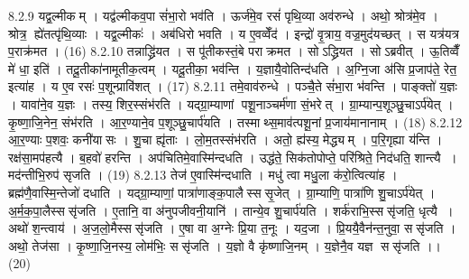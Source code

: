 8.2.9
यद्व॒ल्मीकम् । यद्व॑ल्मीकव॒पा सं॑भा॒रो भव॑ति । ऊर्ज॑मे॒व रसं॑ पृथि॒व्या अव॑रुन्धे । अथो॒ श्रोत्र॑मे॒व । श्रोत्र॒ ह्ये॑तत्पृ॑थि॒व्याः । यद्व॒ल्मीकः॑ । अब॑धिरो भवति । य ए॒वव्वेँद॑ । इन्द्रो॑ वृ॒त्राय॒ वज्र॒मुद॑यच्छत् । स यत्र॑यत्र प॒राक्र॑मत । (16)
8.2.10
तन्नाद्ध्रि॑यत । स पू॑तीकस्तं॒बे पराक्रमत । सोऽद्ध्रियत । सोऽब्रवीत् । ऊ॒तिव्वैँ मे॑ धा॒ इति॑ । तदू॒तीका॑नामूतीक॒त्वम् । यदू॒तीका॒ भव॑न्ति । य॒ज्ञायै॒वोतिन्द॑धति । अ॒ग्नि॒जा अ॑सि प्र॒जाप॑ते॒ रेत॒ इत्या॑ह । य ए॒व रसः॑ प॒शून्प्रावि॑शत् । (17)
8.2.11
तमे॒वाव॑रुन्धे । पञ्चै॒ते सं॑भा॒रा भ॑वन्ति । पाङ्क्तो॑ य॒ज्ञः । यावा॑ने॒व य॒ज्ञः । तस्य॒ शिर॒स्संभ॑रति । यद्ग्रा॒म्याणां पशू॒नाञ्चर्म॑णा सं॒भरेत् । ग्रा॒म्यान्प॒शूञ्छु॒चाऽर्प॑येत् । कृ॒ष्णा॒जि॒नेन॒ संभ॑रति । आ॒र॒ण्याने॒व प॒शूञ्छु॒चार्प॑यति । तस्माथ्स॒माव॑त्पशू॒नां प्र॒जाय॑मानानाम् । (18)
8.2.12
आ॒र॒ण्याः प॒शवः॒ कनी॑यासः । शु॒चा ह्यृ॑ताः । लो॒म॒तस्संभ॑रति । अतो॒ ह्य॑स्य॒ मेद्ध्यम् । प॒रि॒गृह्या य॑न्ति । रक्ष॑सा॒मप॑हत्यै । ब॒हवो॑ हरन्ति । अप॑चितिमे॒वास्मि॑न्दधति । उद्ध॑ते॒ सिक॑तोपोप्ते॒ परि॑श्रिते॒ निद॑धति॒ शान्त्यै । मद॑न्तीभि॒रुप॑ सृजति । (19)
8.2.13
तेज॑ ए॒वास्मि॑न्दधाति । मधु॑ त्वा मधु॒ला क॑रो॒त्वित्या॑ह । ब्रह्म॑णै॒वास्मि॒न्तेजो॑ दधाति । यद्ग्रा॒म्याणां॒ पात्रा॑णाङ्क॒पालैस्ससृ॒जेत् । ग्रा॒म्याणि॒ पात्रा॑णि शु॒चाऽर्प॑येत् । अ॒र्म॒क॒पा॒लैस्ससृ॑जति । ए॒तानि॒ वा अ॑नुपजीवनी॒यानि॑ । तान्ये॒व शु॒चार्प॑यति । शर्क॑राभि॒स्ससृ॑जति॒ धृत्यै । अथो॑ श॒न्त्वाय॑ । अ॒ज॒लो॒मैस्ससृ॑जति । ए॒षा वा अ॒ग्नेः प्रि॒या त॒नूः । यद॒जा । प्रि॒ययै॒वैन॑न्त॒नुवा॒ ससृ॑जति । अथो॒ तेज॑सा । कृ॒ष्णा॒जि॒नस्य॒ लोम॑भिः॒ ससृ॑जति । य॒ज्ञो वै कृ॑ष्णाजि॒नम् । य॒ज्ञेनै॒व यज्ञ ससृ॑जति ।। (20)
\anuvakamend

